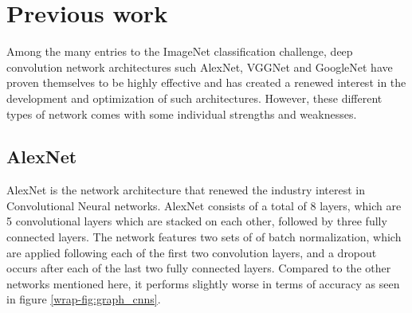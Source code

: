 \documentclass{kthreport}
\begin{document}
\section{Previous work}
\label{sec:PreviousWork}
Among the many entries to the ImageNet classification challenge, deep convolution network architectures such AlexNet, VGGNet and GoogleNet have proven themselves to be highly effective and has created a renewed interest in the development and optimization of such architectures. However, these different types of network comes with some individual strengths and weaknesses.

\subsection{AlexNet}
AlexNet is the network architecture that renewed the industry interest in Convolutional Neural networks. AlexNet consists of a total of 8 layers, which are 5 convolutional layers which are stacked on each other, followed by three fully connected layers. The network features two sets of of batch normalization, which are applied following each of the first two convolution layers, and a dropout occurs after each of the last two fully connected layers. Compared to the other networks mentioned here, it performs slightly worse in terms of accuracy as seen in figure \ref{wrap-fig:graph_cnns}.
\end{document}
